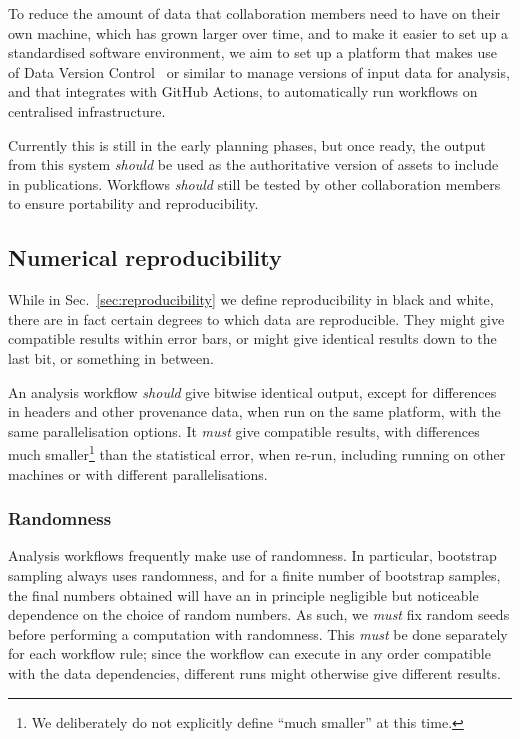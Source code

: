\documentclass{article}
\newcommand\rfcword[1]{\emph{#1}\xspace}
\newcommand\must{\rfcword{must}}
\newcommand\should{\rfcword{should}}
\begin{document}
To reduce the amount of data that collaboration members need to have on their own machine,
which has grown larger over time,
and to make it easier to set up a standardised software environment,
we aim to set up a platform
that makes use of Data Version Control~\cite{dvc} or similar
to manage versions of input data for analysis,
and that integrates with GitHub Actions,
to automatically run workflows on centralised infrastructure.

Currently this is still in the early planning phases,
but once ready,
the output from this system \should be used as
the authoritative version of assets to include in publications.
Workflows \should still be tested by other collaboration members to ensure portability and reproducibility.


\subsection{Numerical reproducibility}\label{sec:numerical-repro}

While in Sec.~\ref{sec:reproducibility} we define reproducibility in black and white,
there are in fact certain degrees to which data are reproducible.
They might give compatible results within error bars,
or might give identical results down to the last bit,
or something in between.

An analysis workflow \should give bitwise identical output,
except for differences in headers and other provenance data,
when run on the same platform,
with the same parallelisation options.
It \must give compatible results,
with differences much smaller\footnote{
  We deliberately do not explicitly define ``much smaller'' at this time.
} than the statistical error,
when re-run,
including running on other machines or with different parallelisations.

\subsubsection{Randomness}

Analysis workflows frequently make use of randomness.
In particular,
bootstrap sampling always uses randomness,
and for a finite number of bootstrap samples,
the final numbers obtained will have
an in principle negligible but noticeable dependence on the choice of random numbers.
As such,
we \must fix random seeds before performing a computation with randomness.
This \must be done separately for each workflow rule;
since the workflow can execute in any order compatible with the data dependencies,
different runs might otherwise give different results.
\end{document}
